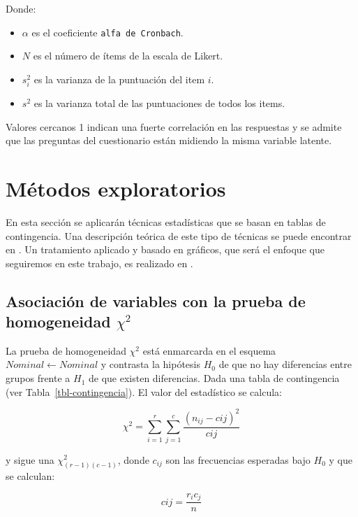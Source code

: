 \documentclass[
  12pt,
  a4paper,
  extrafontsizes,
  onecolumn,
  openright]{memoir}
\providecommand{\tightlist}{%
  \setlength{\itemsep}{0pt}\setlength{\parskip}{0pt}}\usepackage{longtable,booktabs,array}
\begin{document}
Donde:

\begin{itemize}
\tightlist
\item
  \(\alpha\) es el coeficiente \texttt{alfa\ de\ Cronbach}.
\item
  \(N\) es el número de ítems de la escala de Likert.
\item
  \(s_{i}^{2}\) es la varianza de la puntuación del item \(i\).
\item
  \(s^{2}\) es la varianza total de las puntuaciones de todos los items.
\end{itemize}

Valores cercanos 1 indican una fuerte correlación en las respuestas y se
admite que las preguntas del cuestionario están midiendo la misma
variable latente.

\hypertarget{muxe9todos-exploratorios}{%
\section{Métodos exploratorios}\label{muxe9todos-exploratorios}}

En esta sección se aplicarán técnicas estadísticas que se basan en
tablas de contingencia. Una descripción teórica de este tipo de técnicas
se puede encontrar en \textcite{agresti_2018}. Un tratamiento aplicado y
basado en gráficos, que será el enfoque que seguiremos en este trabajo,
es realizado en \textcite{frienly2015}.

\hypertarget{sec-chi2}{%
\subsection{\texorpdfstring{Asociación de variables con la prueba de
homogeneidad
\(\chi^2\)}{Asociación de variables con la prueba de homogeneidad \textbackslash chi\^{}2}}\label{sec-chi2}}

La prueba de homogeneidad \(\chi^2\) \autocite[ver][]{leton2021} está
enmarcarda en el esquema \(Nominal \leftarrow Nominal\) y contrasta la
hipótesis \(H_0\) de que no hay diferencias entre grupos frente a
\(H_1\) de que existen diferencias. Dada una tabla de contingencia (ver
Tabla~\ref{tbl-contingencia}). El valor del estadístico se calcula:

\[
\chi^2 = \sum_{i=1}^r\sum_{j=1}^c\frac{(n_{ij}-c{ij})^2}{c{ij}}
\]

y sigue una \(\chi^2_{(r-1)(c-1)}\), donde \(c_{ij}\) son las
frecuencias esperadas bajo \(H_0\) y que se calculan:

\[
c{ij}=\frac{r_ic_j}{n}
\]
\end{document}
